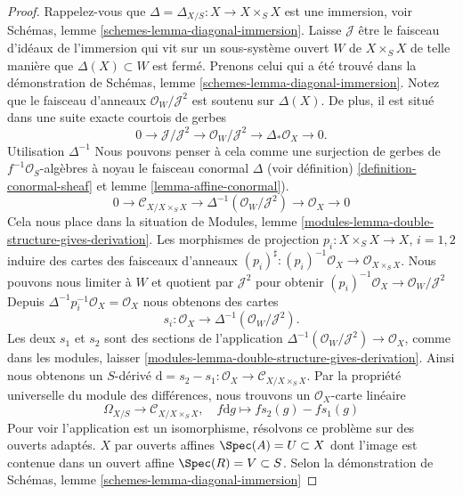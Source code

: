 \begin{proof}
Rappelez-vous que $\Delta = \Delta_{X/S} : X \to X \times_S X$
est une immersion, voir Schémas, lemme \ref{schemes-lemma-diagonal-immersion}. Laisse $\mathcal{J}$ être le faisceau d'idéaux de l'immersion qui vit sur un sous-système ouvert $W$ de $X \times_S X$
de telle manière que $\Delta(X) \subset W$ est fermé. Prenons celui qui a été trouvé dans la démonstration de Schémas, lemme \ref{schemes-lemma-diagonal-immersion}. Notez que le faisceau d'anneaux $\mathcal{O}_W/\mathcal{J}^2$
est soutenu sur $\Delta(X)$. De plus, il est situé dans une suite exacte courtois de gerbes
$$
0 \to \mathcal{J}/\mathcal{J}^2
\to \mathcal{O}_W/\mathcal{J}^2
\to \Delta_*\mathcal{O}_X
\to 0.
$$
Utilisation $\Delta^{-1}$ Nous pouvons penser à cela comme une surjection de gerbes de $f^{-1}\mathcal{O}_S$-algèbres à noyau le faisceau conormal $\Delta$ (voir définition) \ref{definition-conormal-sheaf}
et lemme \ref{lemma-affine-conormal}).
$$
0 \to \mathcal{C}_{X/X \times_S X}
\to \Delta^{-1}(\mathcal{O}_W/\mathcal{J}^2)
\to \mathcal{O}_X
\to 0
$$
Cela nous place dans la situation de Modules, lemme \ref{modules-lemma-double-structure-gives-derivation}. Les morphismes de projection $p_i : X \times_S X \to X$, $i = 1, 2$ induire des cartes des faisceaux d'anneaux
$(p_i)^\sharp : (p_i)^{-1}\mathcal{O}_X \to \mathcal{O}_{X \times_S X}$. Nous pouvons nous limiter à $W$ et quotient par $\mathcal{J}^2$ pour obtenir
$(p_i)^{-1}\mathcal{O}_X \to \mathcal{O}_W/\mathcal{J}^2$Depuis $\Delta^{-1}p_i^{-1}\mathcal{O}_X = \mathcal{O}_X$
nous obtenons des cartes
$$
s_i : \mathcal{O}_X \to \Delta^{-1}(\mathcal{O}_W/\mathcal{J}^2).
$$
Les deux $s_1$ et $s_2$ sont des sections de l'application
$\Delta^{-1}(\mathcal{O}_W/\mathcal{J}^2) \to \mathcal{O}_X$, comme dans les modules, laisser \ref{modules-lemma-double-structure-gives-derivation}. Ainsi nous obtenons un $S$-dérivé
$\text{d} = s_2 - s_1 : \mathcal{O}_X \to \mathcal{C}_{X/X \times_S X}$. Par la propriété universelle du module des différences, nous trouvons un $\mathcal{O}_X$-carte linéaire
$$
\Omega_{X/S} \longrightarrow \mathcal{C}_{X/X \times_S X},\quad
f\text{d}g \longmapsto fs_2(g) - fs_1(g)
$$
Pour voir l'application est un isomorphisme, résolvons ce problème sur des ouverts adaptés. $X$ par ouverts affines $\Spec(A) = U \subset X$
dont l'image est contenue dans un ouvert affine $\Spec(R) = V \subset S$. Selon la démonstration de Schémas, lemme \ref{schemes-lemma-diagonal-immersion}


\end{proof}
